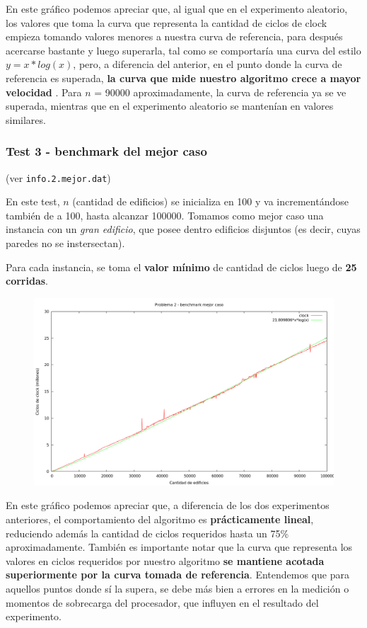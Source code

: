 \vspace*{0.5cm}

En este gráfico podemos apreciar que, al igual que en el experimento aleatorio, los valores que toma la curva 
que representa la cantidad de ciclos de clock empieza tomando valores menores a nuestra curva de referencia, 
para después acercarse bastante y luego superarla, tal como se comportaría una curva del estilo $y = x*log(x)$, 
pero, a diferencia del anterior, en el punto donde la curva de referencia es superada, \textbf{la curva que mide nuestro 
algoritmo crece a mayor velocidad} . Para $n$ = 90000 aproximadamente, la curva de referencia ya se ve superada, 
mientras que en el experimento aleatorio se mantenían en valores similares.


\newpage


\subsubsection{Test 3 - benchmark del mejor caso}

(ver \verb|info.2.mejor.dat|) \medskip

En este test, $n$ (cantidad de edificios) se inicializa en 100 y va incrementándose también de a 100, 
hasta alcanzar 100000. Tomamos como mejor caso una instancia con un \textit{gran edificio}, que posee dentro 
edificios disjuntos (es decir, cuyas paredes no se instersectan).

Para cada instancia, se toma el \textbf{valor mínimo} de cantidad de ciclos luego de \textbf{25 corridas}.


\begin{figure}[h]
  \begin{center}
    \includegraphics[scale=0.35]{imagenes/grafico-2-mejor.png}
  \end{center}
\end{figure}


En este gráfico podemos apreciar que, a diferencia de los dos experimentos anteriores, el comportamiento 
del algoritmo es \textbf{prácticamente lineal}, reduciendo además la cantidad de ciclos requeridos hasta un 75\% 
aproximadamente. También es importante notar que la curva que representa los valores en ciclos requeridos 
por nuestro algoritmo \textbf{se mantiene acotada superiormente por la curva tomada de referencia}. Entendemos que 
para aquellos puntos donde sí la supera, se debe más bien a errores en la medición o momentos de sobrecarga 
del procesador, que influyen en el resultado del experimento. 
